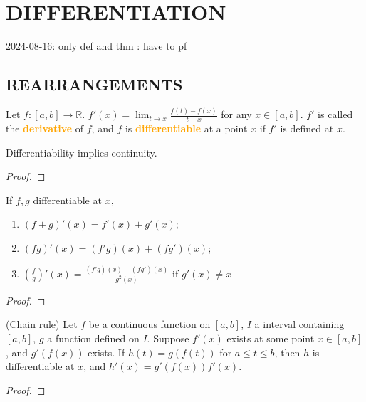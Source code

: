 \section{DIFFERENTIATION}
\begin{notebox}
2024-08-16: only def and thm : have to pf
\end{notebox}
\subsection{REARRANGEMENTS}

\begin{definition}
Let $f:[a,b]\to \mathbb{R}$. $\displaystyle f'(x)=\lim_{t\to x}\frac{f(t)-f(x)}{t-x}$ for any $x\in [a,b]$. $f'$ is called the \textbf{\textcolor{orange}{derivative}} of $f$, and $f$ is \textbf{\textcolor{orange}{differentiable}} at a point $x$ if $f'$ is defined at $x$.
\end{definition}

\begin{theorem}
Differentiability implies continuity.
\end{theorem}
\begin{proof}

\end{proof}

\begin{theorem}
If $f,g$ differentiable at $x$,
\begin{enumerate}[label={(\alph*)}]
\item $(f+g)'(x) = f'(x) + g'(x)$;
\item $(fg)'(x) = (f'g)(x) + (fg')(x)$;
\item $\displaystyle \left(\frac{f}{g}\right)'(x) =  \frac{(f'g)(x)-(fg')(x)}{g^2(x)}$ if $g'(x)\neq x$
\end{enumerate} 
\end{theorem}
\begin{proof}

\end{proof}

\begin{theorem}
(Chain rule) Let $f$ be a continuous function on $[a,b]$, $I$ a interval containing $[a,b]$, $g$ a function defined on $I$. Suppose $f'(x)$ exists at some point $x\in [a,b]$, and $g'(f(x))$ exists. If $h(t) = g(f(t))$ for $a\leq t\leq b$, then $h$ is differentiable at $x$, and $h'(x) = g'(f(x))f'(x)$.
\end{theorem}
\begin{proof}

\end{proof}

